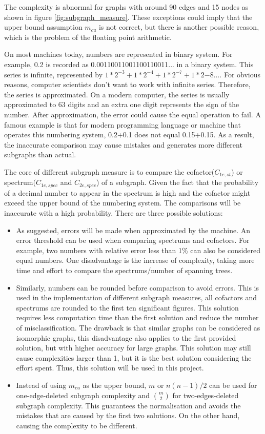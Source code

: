 \documentclass[12pt]{article}
\begin{document}
The complexity is abnormal for graphs with around 90 edges and 15 nodes as shown in figure \ref{fig:subgraph_measure}. These exceptions could imply that the upper bound assumption $m_{cu}$ is not correct, but there is another possible reason, which is the problem of the floating point arithmetic.\par
On most machines today, numbers are represented in binary system\cite{floating_point}. For example, 0.2 is recorded as 0.00110011001100110011... in a binary system. This series is infinite, represented by $1*2^{-3}+1*2^{-4}+1*2^{-7}+1*2{-8}...$. For obvious reasons, computer scientists don't want to work with infinite series. Therefore, the series is approximated. On a modern computer, the series is usually approximated to 63 digits and an extra one digit represents the sign of the number. After approximation, the error could cause the equal operation to fail. A famous example is that for modern programming language or machine that operates this numbering system, 0.2+0.1 does not equal 0.15+0.15. As a result, the inaccurate comparison may cause mistakes and generates more different subgraphs than actual.\par
The core of different subgraph measure is to compare the cofactor($C_{1e,st}$) or spectrum($C_{1e,spec}$ and $C_{2e,spec}$) of a subgraph. Given the fact that the probability of a decimal number to appear in the spectrum is high and the cofactor might exceed the upper bound of the numbering system\cite{python_int}. The comparisons will be inaccurate with a high probability. There are three possible solutions:
\begin{itemize}
    \item As suggested, errors will be made when approximated by the machine. An error threshold can be used when comparing spectrums and cofactors. For example, two numbers with relative error less than 1\% can also be considered equal numbers. One disadvantage is the increase of complexity, taking more time and effort to compare the spectrums/number of spanning trees.
    \item Similarly, numbers can be rounded before comparison to avoid errors. This is used in the implementation of different subgraph measures, all cofactors and spectrums are rounded to the first ten significant figures. This solution requires less computation time than the first solution and reduce the number of misclassification. The drawback is that similar graphs can be considered as isomorphic graphs, this disadvantage also applies to the first provided solution, but with higher accuracy for large graphs. This solution may still cause complexities larger than 1, but it is the best solution considering the effort spent. Thus, this solution will be used in this project.
    \item Instead of using $m_{cu}$ as the upper bound, $m$ or $n(n-1)/2$ can be used for one-edge-deleted subgraph complexity and $\genfrac(){0pt}{2}{m}{2}$ for two-edges-deleted subgraph complexity. This guarantees the normalisation and avoids the mistakes that are caused by the first two solutions. On the other hand, causing the complexity to be different.
\end{itemize}
\end{document}
